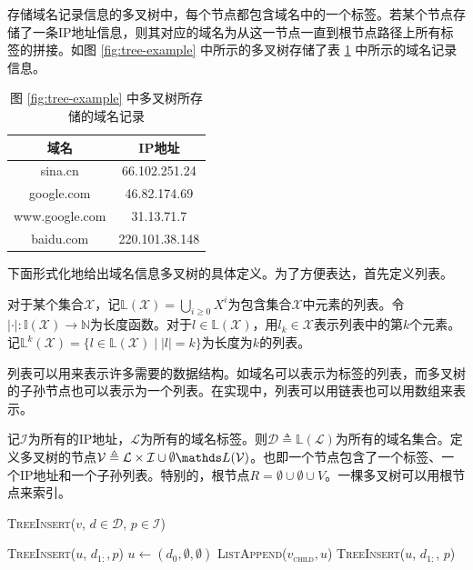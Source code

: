 存储域名记录信息的多叉树中，每个节点都包含域名中的一个标签。若某个节点存储了一条IP地址信息，则其对应的域名为从这一节点一直到根节点路径上所有标签的拼接。如图 \ref{fig:tree-example} 中所示的多叉树存储了表 \ref{tab:tree-example} 中所示的域名记录信息。

\begin{table}[t]
  \centering
  \begin{tabular}{cc}
  \toprule
  域名 & IP地址 \\
  \midrule
  sina.cn & 66.102.251.24 \\
  google.com & 46.82.174.69 \\
  www.google.com & 31.13.71.7 \\
  baidu.com & 220.101.38.148 \\
  \bottomrule
  \end{tabular}
  \caption{图 \ref{fig:tree-example} 中多叉树所存储的域名记录}
  \label{tab:tree-example}
\end{table}

下面形式化地给出域名信息多叉树的具体定义。为了方便表达，首先定义列表。
\begin{definition}[列表]
  对于某个集合$\mathcal X$，记$\mathds L(\mathcal X) = \bigcup_{i \ge 0} X^i$为包含集合$\mathcal X$中元素的列表。令$| \cdot | : \mathds I(\mathcal X) \rightarrow \mathds N$为长度函数。对于$l \in \mathds L(\mathcal X)$，用$l_{k} \in \mathcal X$表示列表中的第$k$个元素。记$\mathds L^k(\mathcal X) = \{ l \in \mathds L(\mathcal X) \mid | l | = k \}$为长度为$k$的列表。
\end{definition}

列表可以用来表示许多需要的数据结构。如域名可以表示为标签的列表，而多叉树的子孙节点也可以表示为一个列表。在实现中，列表可以用链表也可以用数组来表示。

\begin{definition}[域名记录多叉树]
  记$\mathcal I$为所有的IP地址，$\mathcal L$为所有的域名标签。则$\mathcal D \triangleq \mathds L(\mathcal L)$为所有的域名集合。定义多叉树的节点$\mathcal V \triangleq \mathcal L \times \mathcal I \cup \emptyset \mathcal \mathds L(\mathcal V)$。也即一个节点包含了一个标签、一个IP地址和一个子孙列表。特别的，根节点$R = \emptyset \cup \emptyset \cup V$。一棵多叉树可以用根节点来索引。
\end{definition}

\begin{algorithm}[h]
\caption{\textsc{TreeInsert}($v$, $d \in \mathcal D$, $p \in \mathcal I$)}
\label{algo:tree-insert}
 {
   {
    \textsc{TreeInsert}($u$, $d_{1:}, p$)\;
    \Return\;
  }
}
$u \gets (d_0, \emptyset, \emptyset)$\;
\textsc{ListAppend($v_{\text{child}}, u$)}\;
\textsc{TreeInsert}($u$, $d_{1:}$, $p$)\;
\end{algorithm}


